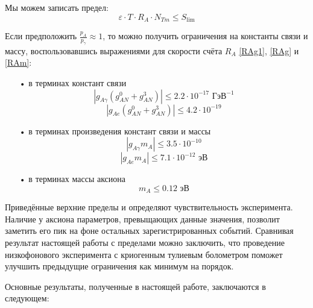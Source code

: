\documentclass[a4paper,article,14pt]{extarticle}
\begin{document}
Мы можем записать предел:
\begin{equation}
    \varepsilon  \cdot T \cdot {R_A} \cdot N_{Tm} \leqslant {S_{\lim }}
\end{equation}

Если предположить $\frac{{{p_A}}}{{{p_\gamma}}} \approx 1$, то можно получить ограничения на константы связи и массу, воспользовавшись выражениями для скорости счёта ${R_A}$ \eqref{RAg1}, \eqref{RAg} и \eqref{RAm}:

\begin{enumerate}
    \item[•] в терминах констант связи
          \begin{equation}
              \left| g_{A\gamma}{\left( {g_{AN}^0 + g_{AN}^3} \right)} \right| \leqslant 2.2 \cdot 10^{-17} \text{ ГэВ}^{-1}
          \end{equation}
          \begin{equation}
              \left| g_{Ae}{\left( {g_{AN}^0 + g_{AN}^3} \right)} \right| \leqslant 4.2 \cdot 10^{-19}
          \end{equation}
    \item[•] в терминах произведения констант связи и массы
          \begin{equation}
              \left| {{g_{A\gamma}}{m_A}} \right| \leqslant 3.5 \cdot 10^{-10}
          \end{equation}
          \begin{equation}
              \left| {{g_{Ae}}{m_A}} \right| \leqslant 7.1 \cdot 10^{-12} \text{ эВ}
          \end{equation}
    \item[•] в терминах массы аксиона
          \begin{equation}
              m_A \leqslant 0.12 \text{ эВ}
          \end{equation}
\end{enumerate}

Приведённые верхние пределы и определяют чувствительность эксперимента. Наличие у аксиона параметров, превыщающих данные значения, позволит заметить его пик на фоне остальных зарегистрированных событий. Сравнивая результат настоящей работы с пределами \cite{newlimits_tm} можно заключить, что проведение низкофонового эксперимента с криогенным тулиевым болометром поможет улучшить предыдущие ограничения как минимум на порядок.

Основные результаты, полученные в настоящей работе, заключаются в следующем:
\end{document}
